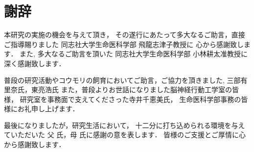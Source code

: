\documentclass[main]{subfiles}
\begin{document}
\chapter*{謝辞}

本研究の実施の機会を与えて頂き，
その遂行にあたって多大なるご助言，直接ご指導賜りました
同志社大学生命医科学部 飛龍志津子教授に
心から感謝致します．
また, 多大なるご助言を頂いた
同志社大学生命医科学部 小林耕太准教授に深く感謝致します．

普段の研究活動やコウモリの飼育においてご助言，ご協力を頂きました,
三部有里奈氏，東亮浩氏
また，普段よりお世話になりました脳神経行動工学室の皆様，
研究室を事務面で支えてくださった寺井千恵美氏，
生命医科学部事務の皆様にお礼申し上げます．

最後になりましたが，研究生活において，
十二分に打ち込められる環境を与えていただいた
父 氏，母 氏に感謝の意を表します．
皆様のご支援とご厚情に心から感謝致します．
\end{document}
